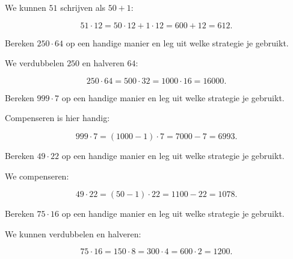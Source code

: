 \documentclass{ximera}
\begin{document}
\begin{oefening}{\oefU\ESS}
\begin{question}
\begin{oplossing}

We kunnen \(51\) schrijven als \(50+1\):

\[
51\cdot12
=
50\cdot12+1\cdot12
=
600+12
=
612.
\]

\end{oplossing}

\end{question}


\begin{question}

Bereken \(250\cdot64\) op een handige manier en leg uit welke strategie je
gebruikt.

\begin{oplossing}

We verdubbelen \(250\) en halveren \(64\):

\[
250\cdot64
=
500\cdot32
=
1000\cdot16
=
16000.
\]

\end{oplossing}

\end{question}


\begin{question}

Bereken \(999\cdot7\) op een handige manier en leg uit welke strategie je
gebruikt.

\begin{oplossing}

Compenseren is hier handig:

\[
999\cdot7
=
(1000-1)\cdot7
=
7000-7
=
6993.
\]

\end{oplossing}

\end{question}


\begin{question}

Bereken \(49\cdot22\) op een handige manier en leg uit welke strategie je
gebruikt.

\begin{oplossing}

We compenseren:

\[
49\cdot22
=
(50-1)\cdot22
=
1100-22
=
1078.
\]

\end{oplossing}

\end{question}


\begin{question}

Bereken \(75\cdot16\) op een handige manier en leg uit welke strategie je
gebruikt.

\begin{oplossing}

We kunnen verdubbelen en halveren:

\[
75\cdot16
=
150\cdot8
=
300\cdot4
=
600\cdot2
=
1200.
\]

\end{oplossing}

\end{question}

\end{oefening}
\end{document}
